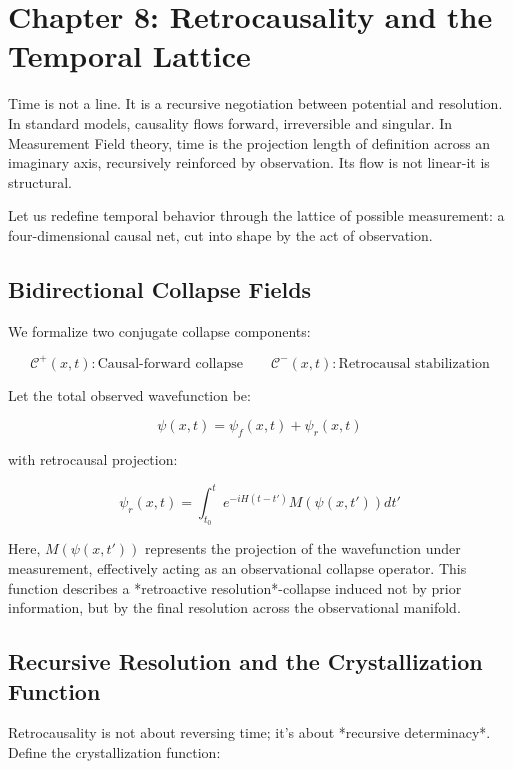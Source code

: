 \newpage
{}
\setcounter{page}{156} %
\fancyhead[L]{\leftmark} %
\renewcommand{\thesection}{8.\arabic{section}}
\chapter*{Chapter 8: Retrocausality and the Temporal Lattice}

Time is not a line. It is a recursive negotiation between potential and resolution. In standard models, causality flows forward, irreversible and singular. In Measurement Field theory, time is the projection length of definition across an imaginary axis, recursively reinforced by observation. Its flow is not linear-it is structural.

Let us redefine temporal behavior through the lattice of possible measurement: a four-dimensional causal net, cut into shape by the act of observation.

\section{Bidirectional Collapse Fields}\cite{chapter8_meta}

We formalize two conjugate collapse components:

\[
\mathcal{C}^+(x,t): \text{Causal-forward collapse} \qquad \mathcal{C}^-(x,t): \text{Retrocausal stabilization}
\]

Let the total observed wavefunction be:

\[
\psi(x,t) = \psi_f(x,t) + \psi_r(x,t)
\]

with retrocausal projection:

\[
\psi_r(x,t) = \int_{t_0}^{t} e^{-iH(t - t')} M(\psi(x,t')) dt'
\]

Here, \( M(\psi(x,t')) \) represents the projection of the wavefunction under measurement, effectively acting as an observational collapse operator. This function describes a *retroactive resolution*-collapse induced not by prior information, but by the final resolution across the observational manifold.

\section{Recursive Resolution and the Crystallization Function}

Retrocausality is not about reversing time; it’s about *recursive determinacy*. Define the crystallization function:

